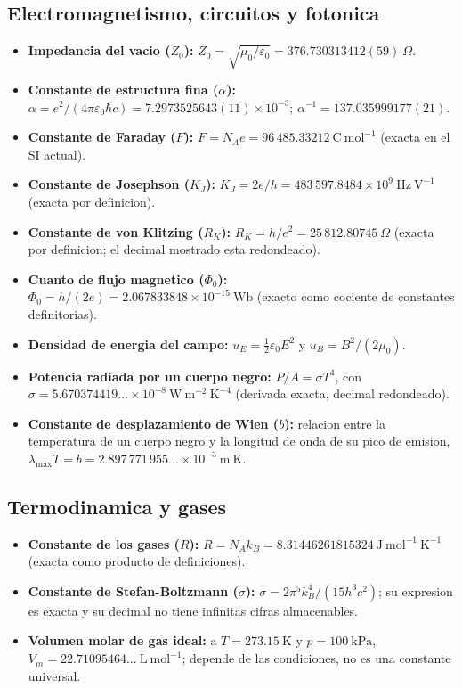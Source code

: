 \documentclass[11pt,a4paper]{article}
\begin{document}
\subsection*{Electromagnetismo, circuitos y fotonica}

\begin{itemize}
  \item \textbf{Impedancia del vacio ($Z_0$):} $Z_0=\sqrt{\mu_0/\varepsilon_0}=376.730313412(59)\ \Omega$.
  \item \textbf{Constante de estructura fina ($\alpha$):} $\alpha=e^2/(4\pi\varepsilon_0\hbar c)=7.2973525643(11)\times10^{-3}$; $\alpha^{-1}=137.035999177(21)$.
  \item \textbf{Constante de Faraday ($F$):} $F=N_Ae=96\,485.33212\ \mathrm{C\ mol^{-1}}$ (exacta en el SI actual).
  \item \textbf{Constante de Josephson ($K_J$):} $K_J=2e/h=483\,597.8484\times10^9\ \mathrm{Hz\ V^{-1}}$ (exacta por definicion).
  \item \textbf{Constante de von Klitzing ($R_K$):} $R_K=h/e^2=25\,812.80745\ \Omega$ (exacta por definicion; el decimal mostrado esta redondeado).
  \item \textbf{Cuanto de flujo magnetico ($\Phi_0$):} $\Phi_0=h/(2e)=2.067833848\times10^{-15}\ \mathrm{Wb}$ (exacto como cociente de constantes definitorias).
  \item \textbf{Densidad de energia del campo:} $u_E=\tfrac12\varepsilon_0E^2$ y $u_B=B^2/(2\mu_0)$.
  \item \textbf{Potencia radiada por un cuerpo negro:} $P/A=\sigma T^4$, con $\sigma=5.670374419...\times10^{-8}\ \mathrm{W\ m^{-2}\ K^{-4}}$ (derivada exacta, decimal redondeado).
  \item \textbf{Constante de desplazamiento de Wien ($b$):} relacion entre la temperatura de un cuerpo negro y la longitud de onda de su pico de emision, $\lambda_{\mathrm{max}}T = b = 2.897\,771\,955...\times10^{-3}\ \mathrm{m\ K}$.
\end{itemize}

\subsection*{Termodinamica y gases}

\begin{itemize}
  \item \textbf{Constante de los gases ($R$):} $R=N_Ak_B=8.31446261815324\ \mathrm{J\ mol^{-1}\ K^{-1}}$ (exacta como producto de definiciones).
  \item \textbf{Constante de Stefan-Boltzmann ($\sigma$):} $\sigma=2\pi^5k_B^4/(15h^3c^2)$; su expresion es exacta y su decimal no tiene infinitas cifras almacenables.
  \item \textbf{Volumen molar de gas ideal:} a $T=273.15\ \mathrm K$ y $p=100\ \mathrm{kPa}$, $V_m=22.71095464...\ \mathrm{L\ mol^{-1}}$; depende de las condiciones, no es una constante universal.
\end{itemize}
\end{document}
